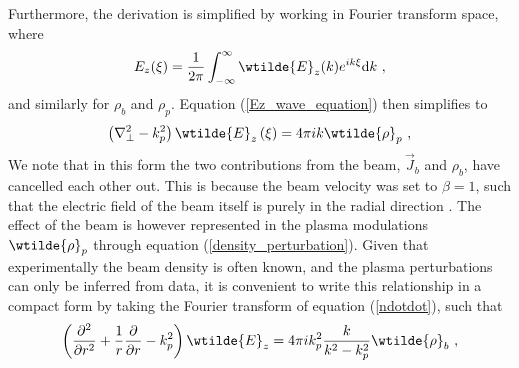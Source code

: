 Furthermore, the derivation is simplified by working in Fourier transform space, where
\begin{equation}
E_z(\xi)=\frac{1}{2\pi}\int_ {-\infty}^{\infty}\wtilde{E}_z(k)e^{ik\xi}\mathrm{d}k~,
\end{equation}
and similarly for $\rho_b$ and $\rho_p$. Equation (\ref{Ez_wave_equation}) then simplifies to
\begin{equation}
\left(\nabla^2_{\perp}-k^2_p\right)\wtilde{E}_z\left(\xi\right)=4\pi i k\wtilde{\rho}_p~,
\end{equation}
We note that in this form the two contributions from the beam, $\vec{J}_b$ and $\rho_b$, have cancelled each other out. This is because the beam velocity was set to $\beta=1$, such that the electric field of the beam itself is purely in the radial direction \citep{Gessner2016}. The effect of the beam is however represented in the plasma modulations $\wtilde{\rho}_p$ through equation (\ref{density_perturbation}). Given that experimentally the beam density is often known, and the plasma perturbations can only be inferred from data, it is convenient to write this relationship in a compact form by taking the Fourier transform of equation (\ref{ndotdot}), such that
\begin{equation}
 \left(\frac{\partial^2 }{\partial r^2}+\frac{1}{r}\frac{\partial }{\partial r} -k^2_p\right)\wtilde{E}_z
=4\pi ik_p^2 \frac{k}{k^2-k_p^2}\wtilde{\rho}_b~,
\label{diffeq_in_transformspace}
\end{equation}
